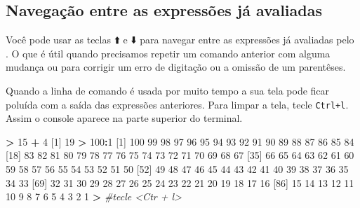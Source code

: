 \documentclass[]{book}
\newenvironment{Shaded}{\begin{snugshade}}{\end{snugshade}}
\newcommand{\DecValTok}[1]{\textcolor[rgb]{0.00,0.00,0.81}{#1}}
\newcommand{\StringTok}[1]{\textcolor[rgb]{0.31,0.60,0.02}{#1}}
\newcommand{\CommentTok}[1]{\textcolor[rgb]{0.56,0.35,0.01}{\textit{#1}}}
\newcommand{\OperatorTok}[1]{\textcolor[rgb]{0.81,0.36,0.00}{\textbf{#1}}}
\newcommand{\NormalTok}[1]{#1}
\begin{document}
\subsection{Navegação entre as expressões já
avaliadas}\label{navegacao-entre-as-expressoes-ja-avaliadas}

Você pode usar as teclas ⬆️ e ⬇️ para navegar entre as expressões já
avaliadas pelo . O que é útil quando precisamos repetir um comando
anterior com alguma mudança ou para corrigir um erro de digitação ou a
omissão de um parentêses.

Quando a linha de comando é usada por muito tempo a sua tela pode ficar
poluída com a saída das expressões anteriores. Para limpar a tela, tecle
\texttt{Ctrl+l}. Assim o console aparece na parte superior do terminal.

\begin{Shaded}
\begin{Highlighting}[]
\OperatorTok{>}\StringTok{ }\DecValTok{15} \OperatorTok{+}\StringTok{ }\DecValTok{4}
\NormalTok{[}\DecValTok{1}\NormalTok{] }\DecValTok{19}
\OperatorTok{>}\StringTok{ }\DecValTok{100}\OperatorTok{:}\DecValTok{1}
\NormalTok{  [}\DecValTok{1}\NormalTok{] }\DecValTok{100}  \DecValTok{99}  \DecValTok{98}  \DecValTok{97}  \DecValTok{96}  \DecValTok{95}  \DecValTok{94}  \DecValTok{93}  \DecValTok{92}  \DecValTok{91}  \DecValTok{90}  \DecValTok{89}  \DecValTok{88}  \DecValTok{87}  \DecValTok{86}  \DecValTok{85}  \DecValTok{84}
\NormalTok{ [}\DecValTok{18}\NormalTok{]  }\DecValTok{83}  \DecValTok{82}  \DecValTok{81}  \DecValTok{80}  \DecValTok{79}  \DecValTok{78}  \DecValTok{77}  \DecValTok{76}  \DecValTok{75}  \DecValTok{74}  \DecValTok{73}  \DecValTok{72}  \DecValTok{71}  \DecValTok{70}  \DecValTok{69}  \DecValTok{68}  \DecValTok{67}
\NormalTok{ [}\DecValTok{35}\NormalTok{]  }\DecValTok{66}  \DecValTok{65}  \DecValTok{64}  \DecValTok{63}  \DecValTok{62}  \DecValTok{61}  \DecValTok{60}  \DecValTok{59}  \DecValTok{58}  \DecValTok{57}  \DecValTok{56}  \DecValTok{55}  \DecValTok{54}  \DecValTok{53}  \DecValTok{52}  \DecValTok{51}  \DecValTok{50}
\NormalTok{ [}\DecValTok{52}\NormalTok{]  }\DecValTok{49}  \DecValTok{48}  \DecValTok{47}  \DecValTok{46}  \DecValTok{45}  \DecValTok{44}  \DecValTok{43}  \DecValTok{42}  \DecValTok{41}  \DecValTok{40}  \DecValTok{39}  \DecValTok{38}  \DecValTok{37}  \DecValTok{36}  \DecValTok{35}  \DecValTok{34}  \DecValTok{33}
\NormalTok{ [}\DecValTok{69}\NormalTok{]  }\DecValTok{32}  \DecValTok{31}  \DecValTok{30}  \DecValTok{29}  \DecValTok{28}  \DecValTok{27}  \DecValTok{26}  \DecValTok{25}  \DecValTok{24}  \DecValTok{23}  \DecValTok{22}  \DecValTok{21}  \DecValTok{20}  \DecValTok{19}  \DecValTok{18}  \DecValTok{17}  \DecValTok{16}
\NormalTok{ [}\DecValTok{86}\NormalTok{]  }\DecValTok{15}  \DecValTok{14}  \DecValTok{13}  \DecValTok{12}  \DecValTok{11}  \DecValTok{10}   \DecValTok{9}   \DecValTok{8}   \DecValTok{7}   \DecValTok{6}   \DecValTok{5}   \DecValTok{4}   \DecValTok{3}   \DecValTok{2}   \DecValTok{1}
\OperatorTok{>}\StringTok{ }\CommentTok{#tecle <Ctr + l>}
\end{Highlighting}
\end{Shaded}
\end{document}
